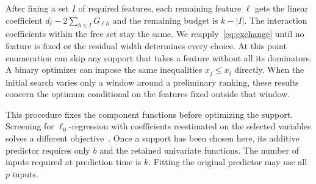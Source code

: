 After fixing a set $I$ of required features, each remaining feature $\ell$
gets the linear coefficient $d_\ell-2\sum_{h\in I}G_{\ell h}$ and the
remaining budget is $k-|I|$. The interaction coefficients within the free set
stay the same. We reapply~\eqref{eq:exchange} until no feature is fixed or
the residual width determines every choice. At this point enumeration can
skip any support that takes a feature without all its dominators. A binary
optimizer can impose the same inequalities $x_j\le x_i$ directly.
When the initial search varies only a window around a preliminary ranking,
these results concern the optimum conditional on the features fixed outside
that window.

This procedure fixes the component functions before optimizing the support.
Screening for $\ell_0$-regression with coefficients reestimated on the selected
variables solves a different objective~\cite{atamturk2020screening}. Once a
support has been chosen here, its additive predictor requires only $b$ and
the retained univariate functions. The number of inputs required at prediction
time is $k$. Fitting the original predictor may use all $p$ inputs.
